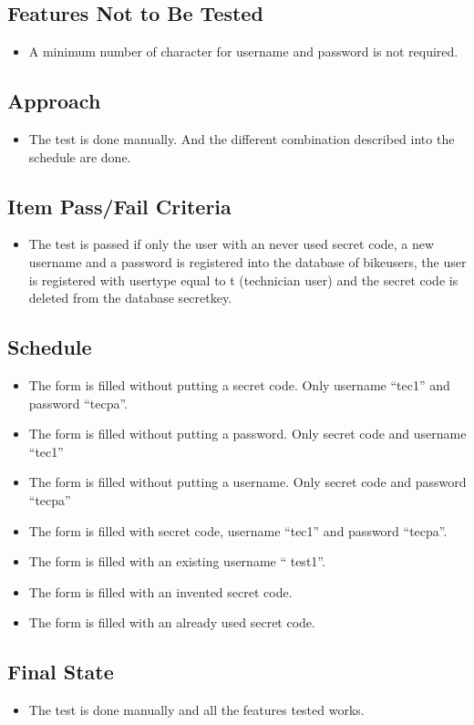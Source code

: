 \documentclass{article}
\begin{document}
\subsection{Features Not to Be Tested}
\begin{itemize}
    \item A minimum number of character for username and password is not required. 
\end{itemize}
\subsection{Approach}
\begin{itemize}
    \item The test is done manually. And the different combination described into the schedule are done. 
\end{itemize}
\subsection{Item Pass/Fail Criteria}
\begin{itemize}
    \item The test is passed if only the user with an never used secret code, a new username and a password is registered into the database of bike\textunderscore users, the user is registered with user\textunderscore type equal to t (technician user) and the secret code is deleted from the database secret\textunderscore key.
   \end{itemize}
\subsection{Schedule}
\begin{itemize}
    \item The form is filled without putting a secret code. Only username “tec1” and password “tecpa”.
    \item The form is filled without putting a password. Only secret code and username “tec1”
    \item The form is filled without putting a username. Only secret code and password “tecpa”
    \item The form is filled with secret code, username “tec1” and password “tecpa”.
    \item The form is filled with an existing username “ test1”.
    \item The form is filled with an invented secret code.
    \item The form is filled with an already used secret code.
\end{itemize}
\subsection{Final State}
\begin{itemize}
    \item The test is done manually and all the features tested works.
\end{itemize}
\end{document}
